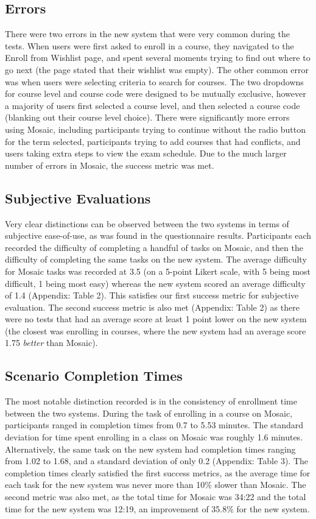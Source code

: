 \documentclass[10pt]{article}
\begin{document}
\begin{multicols}{2}
\subsection*{Errors}
There were two errors in the new system that were very common during the tests. When users were first asked to enroll in a course, they navigated to the Enroll from Wishlist page, and spent several moments trying to find out where to go next (the page stated that their wishlist was empty). The other common error was when users were selecting criteria to search for courses. The two dropdowns for course level and course code were designed to be mutually exclusive, however a majority of users first selected a course level, and then selected a course code (blanking out their course level choice). There were significantly more errors using Mosaic, including participants trying to continue without the radio button for the term selected, participants trying to add courses that had conflicts, and users taking extra steps to view the exam schedule. Due to the much larger number of errors in Mosaic, the success metric was met.

\subsection*{Subjective Evaluations}
Very clear distinctions can be observed between the two systems in terms of subjective ease-of-use, as was found in the questionnaire results. Participants each recorded the difficulty of completing a handful of tasks on Mosaic, and then the difficulty of completing the same tasks on the new system. The average difficulty for Mosaic tasks was recorded at 3.5 (on a 5-point Likert scale, with 5 being most difficult, 1 being most easy) whereas the new system scored an average difficulty of 1.4 (Appendix: Table 2). This satisfies our first success metric for subjective evaluation. The second success metric is also met (Appendix: Table 2) as there were no tests that had an average score at least 1 point lower on the new system (the closest was enrolling in courses, where the new system had an average score 1.75 \emph{better} than Mosaic).

\subsection*{Scenario Completion Times}
The most notable distinction recorded is in the consistency of enrollment time between the two systems. During the task of enrolling in a course on Mosaic, participants ranged in completion times from 0.7 to 5.53 minutes. The standard deviation for time spent enrolling in a class on Mosaic was roughly 1.6 minutes. Alternatively, the same task on the new system had completion times ranging from 1.02 to 1.68, and a standard deviation of only 0.2 (Appendix: Table 3). The completion times clearly satisfied the first success metrics, as the average time for each task for the new system was never more than 10\% slower than Mosaic. The second metric was also met, as the total time for Mosaic was 34:22 and the total time for the new system was 12:19, an improvement of 35.8\% for the new system.\\


\end{multicols}
\end{document}
